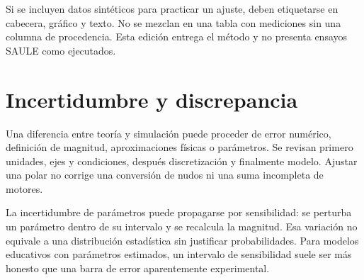 Si se incluyen datos sintéticos para practicar un ajuste, deben etiquetarse en cabecera, gráfico y texto. No se mezclan en una tabla con mediciones sin una columna de procedencia. Esta edición entrega el método y no presenta ensayos SAULE como ejecutados.

\section{Incertidumbre y discrepancia}
Una diferencia entre teoría y simulación puede proceder de error numérico, definición de magnitud, aproximaciones físicas o parámetros. Se revisan primero unidades, ejes y condiciones, después discretización y finalmente modelo. Ajustar una polar no corrige una conversión de nudos ni una suma incompleta de motores.

La incertidumbre de parámetros puede propagarse por sensibilidad: se perturba un parámetro dentro de su intervalo y se recalcula la magnitud. Esa variación no equivale a una distribución estadística sin justificar probabilidades. Para modelos educativos con parámetros estimados, un intervalo de sensibilidad suele ser más honesto que una barra de error aparentemente experimental.



